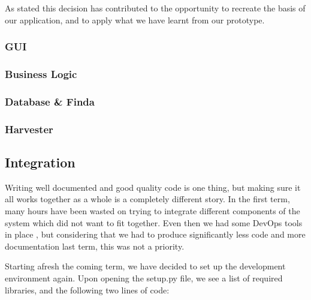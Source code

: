 \documentclass[main.tex]{subfiles}
\begin{document}
As stated this decision has contributed to the opportunity to recreate the basis of our application, and to apply what we have learnt from our prototype. 

\subsubsection{GUI}
\subsubsection{Business Logic}
\label{BL}
\subsubsection{Database \& Finda}
\subsubsection{Harvester}

\subsection{Integration}
\label{Coding Standards}
 
 Writing well documented and good quality code is one thing, but making sure it all works together as a whole is a completely different story. In the first term, many hours have been wasted on trying to integrate different components of the system which did not want to fit together. Even then we had some DevOps tools in place \cite{DevOps}, but considering that we had to produce significantly less code and more documentation last term, this was not a priority. 
 
 Starting afresh the coming term, we have decided to set up the development environment again. Upon opening the setup.py file, we see a list of required libraries, and the following two lines of code:
\end{document}
